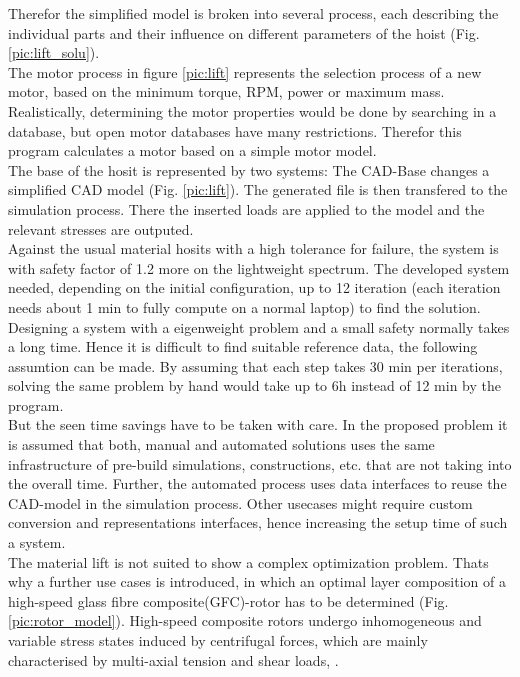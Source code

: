 Therefor the simplified model is broken into several process, each describing the individual parts and their influence on different parameters of the hoist (Fig. \ref{pic:lift_solu}).\\
The motor process in figure \ref{pic:lift} represents the selection process of a new motor, based on the minimum torque, RPM, power or maximum mass.
Realistically, determining the motor properties would be done by searching in a database, but open motor databases have many restrictions.
Therefor this program calculates a motor based on a simple motor model.\\
The base of the hosit is represented by two systems:
The CAD-Base changes a simplified CAD model (Fig. \ref{pic:lift}).
The generated file is then  transfered to the simulation process.
There the inserted loads are applied to the model and the relevant stresses are outputed.\\
Against the usual material hosits with a high tolerance for failure,
the system is with safety factor of 1.2 more on the lightweight spectrum.
The developed system needed, depending on the initial configuration, up to 12 iteration (each iteration needs about 1 min to fully compute on a normal laptop) to find the solution.
Designing a system with a eigenweight problem and a small safety normally takes a long time.
Hence it is difficult to find suitable reference data, the following assumtion can be made.
By assuming that each step takes 30 min per iterations, solving the same problem by hand would take up to 6h instead of 12 min by the program.\\
But the seen time savings have to be taken with care.
In the proposed problem it is assumed that both, manual and automated solutions uses the same infrastructure of pre-build simulations, constructions, etc. that are not taking into the overall time.
Further, the automated process uses data interfaces to reuse the CAD-model in the simulation process.
Other usecases might require custom conversion and representations interfaces, hence increasing the setup time of such a system.\\
The material lift is not suited to show a complex optimization problem.
Thats why a further use cases is introduced, 
in which an optimal layer composition of a 
high-speed glass fibre composite(GFC)-rotor has to be determined (Fig. \ref{pic:rotor_model}).
High-speed composite rotors undergo inhomogeneous and variable stress states induced
by centrifugal forces, which are mainly characterised by multi-axial tension and shear
loads, \cite{filippatos_damage_2017}.
